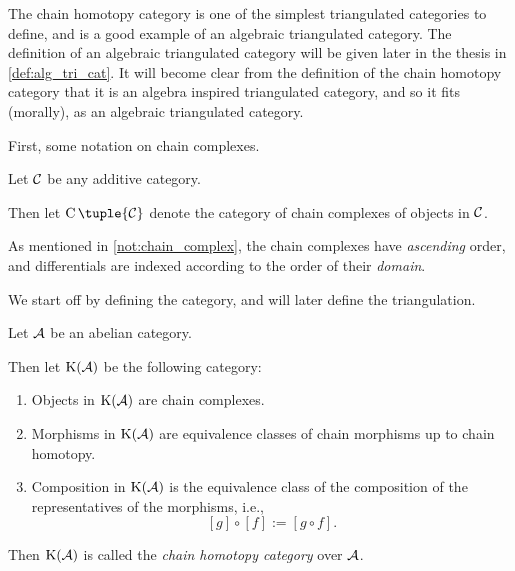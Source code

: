The chain homotopy category is one of the simplest triangulated categories to define, and is a good example of an algebraic triangulated category. The definition of an algebraic triangulated category will be given later in the thesis in \autoref{def:alg_tri_cat}. It will become clear from the definition of the chain homotopy category that it is an algebra inspired triangulated category, and so it fits (morally), as an algebraic triangulated category.


First, some notation on chain complexes.

\begin{definition}
    \label{def:chain_complex}
    Let \( {\mathcal{C}} \) be any additive category.
    
    Then let \( \C \tuple{\Cc} \) denote the category of chain complexes of objects in \( {\mathcal{C}} \).

    As mentioned in \autoref{not:chain_complex}, the chain complexes have \emph{ascending} order, and differentials are indexed according to the order of their \emph{domain}.
\end{definition}

We start off by defining the category, and will later define the triangulation.

\begin{definition}
    \label{def:chain_homotopy_cat}
    Let \( {\mathcal{A}} \) be an abelian category.

    Then let \( \operatorname{K}({\mathcal{A}}) \) be the following category:
    \begin{enumerate}
        \item {
            Objects in \( \operatorname{K}({\mathcal{A}}) \) are chain complexes.
        }
        \item {
            Morphisms in \( \operatorname{K}({\mathcal{A}}) \) are equivalence classes of chain morphisms up to chain homotopy.
        }
        \item {
            Composition in \( \operatorname{K}({\mathcal{A}}) \) is the equivalence class of the composition of the representatives of the morphisms, i.e.,
            \[
                [g] \circ [f] := [g \circ f ].
            \]
        }
    \end{enumerate}

    Then \( \operatorname{K}({\mathcal{A}}) \) is called the \emph{chain homotopy category} over \( {\mathcal{A}} \).
\end{definition}

